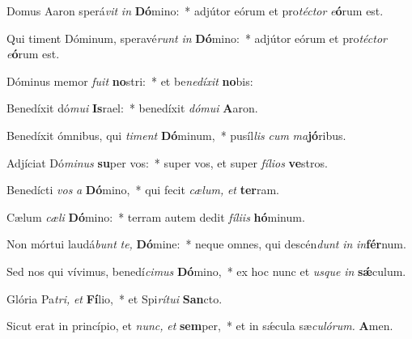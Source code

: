 \item Domus Aaron sperá\textit{vit} \textit{in} \textbf{Dó}mino:~* adjútor eórum et pro\textit{téctor} \textit{e}\textbf{ó}rum est.
\item Qui timent Dóminum, speravé\textit{runt} \textit{in} \textbf{Dó}mino:~* adjútor eórum et pro\textit{téctor} \textit{e}\textbf{ó}rum est.
\item Dóminus memor \textit{fuit} \textbf{no}stri:~* et be\textit{nedíxit} \textbf{no}bis:
\item Benedíxit dó\textit{mui} \textbf{Is}rael:~* benedíxit \textit{dómui} \textbf{A}aron.
\item Benedíxit ómnibus, qui \textit{timent} \textbf{Dó}minum,~* pusíl\textit{lis} \textit{cum} \textit{ma}\textbf{jó}ribus.
\item Adjíciat Dó\textit{minus} \textbf{su}per vos:~* super vos, et super \textit{fílios} \textbf{ve}stros.
\item Benedícti \textit{vos} \textit{a} \textbf{Dó}mino,~* qui fecit \textit{cælum,} \textit{et} \textbf{ter}ram.
\item Cælum \textit{cæli} \textbf{Dó}mino:~* terram autem dedit \textit{fíliis} \textbf{hó}minum.
\item Non mórtui laudá\textit{bunt} \textit{te,} \textbf{Dó}mine:~* neque o\-mnes, qui descén\textit{dunt} \textit{in} \textit{in}\textbf{fér}num.
\item Sed nos qui vívimus, benedí\textit{cimus} \textbf{Dó}mino,~* ex hoc nunc et \textit{usque} \textit{in} \textbf{sǽ}culum.
\item Glória Pa\tinyhspace\textit{tri,} \textit{et} \textbf{Fí}lio,~* et Spi\tinyhspace\textit{rítui} \textbf{San}cto.
\item Sicut erat in princípio, et \textit{nunc,} \textit{et} \textbf{sem}per,~* et in sǽcula sæ\tinyhspace\textit{culórum.} \textbf{A}men.
